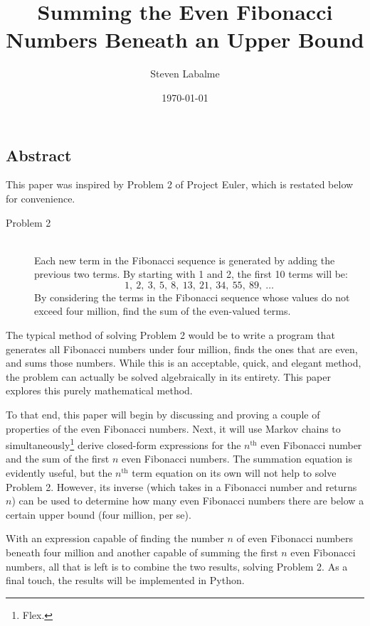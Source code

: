 \documentclass[titlepage]{article}
\title{Summing the Even Fibonacci Numbers Beneath an Upper Bound}
\author{Steven Labalme}
\date{\today}
\begin{document}
\maketitle



\tableofcontents
\newpage



\pagestyle{fancy}
\fancyhf{}
\renewcommand{\headrulewidth}{0pt}
\begin{center}
    \setcounter{secnumdepth}{0}
    \section{Abstract}
    \setcounter{secnumdepth}{3}
\end{center}
This paper was inspired by Problem 2 of Project Euler, which is restated below for convenience.

\vspace{8pt}
\begin{prob}
    \begin{description}
        \item[Problem 2] \hfill \\ Each new term in the Fibonacci sequence is generated by adding the previous two terms. By starting with 1 and 2, the first 10 terms will be:
        \begin{equation*}
            1,\ 2,\ 3,\ 5,\ 8,\ 13,\ 21,\ 34,\ 55,\ 89,\ \dots
        \end{equation*}
        By considering the terms in the Fibonacci sequence whose values do not exceed four million, find the sum of the even-valued terms.
    \end{description}
\end{prob}

The typical method of solving Problem 2 would be to write a program that generates all Fibonacci numbers under four million, finds the ones that are even, and sums those numbers. While this is an acceptable, quick, and elegant method, the problem can actually be solved algebraically in its entirety. This paper explores this purely mathematical method.\par
To that end, this paper will begin by discussing and proving a couple of properties of the even Fibonacci numbers. Next, it will use Markov chains to simultaneously\footnote{Flex.} derive closed-form expressions for the $n^\text{th}$ even Fibonacci number and the sum of the first $n$ even Fibonacci numbers. The summation equation is evidently useful, but the $n^\text{th}$ term equation on its own will not help to solve Problem 2. However, its inverse (which takes in a Fibonacci number and returns $n$) can be used to determine how many even Fibonacci numbers there are below a certain upper bound (four million, per se).\par
With an expression capable of finding the number $n$ of even Fibonacci numbers beneath four million and another capable of summing the first $n$ even Fibonacci numbers, all that is left is to combine the two results, solving Problem 2. As a final touch, the results will be implemented in Python.
\newpage
\end{document}
